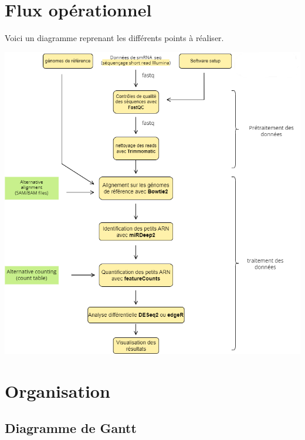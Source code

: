 \documentclass{report}
\begin{document}
\chapter{Flux opérationnel}
Voici un diagramme reprenant les différents points à réaliser.
\begin{center}
    \includegraphics[scale=1.0]{Images/PIPLINE_RNA.png}\\[1cm]
\end{center}
\chapter{Organisation}
\section{Diagramme de Gantt}


\end{document}
